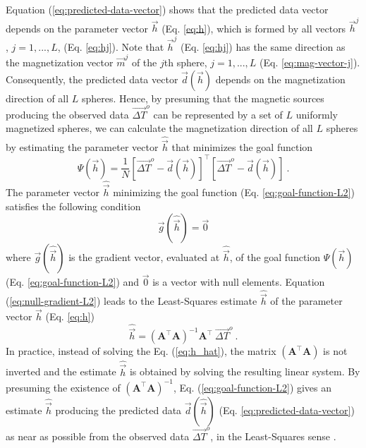\documentclass[journal abbreviation, npg]{copernicus}
\begin{document}
Equation (\ref{eq:predicted-data-vector}) shows that the predicted data vector depends on the parameter vector $\vec{h}$ (Eq. \ref{eq:h}), which is formed by all vectors $\vec{h}^{j}$, $j = 1, ..., L$, (Eq. \ref{eq:hj}). Note that $\vec{h}^{j}$ (Eq. \ref{eq:hj}) has the same direction as the magnetization vector $\vec{m}^{j}$ of the $j$th sphere, $j = 1, ..., L$ (Eq. \ref{eq:mag-vector-j}). Consequently, the predicted data vector $\vec{d}(\vec{h})$ depends on the magnetization direction of all $L$ spheres. Hence, by presuming that the magnetic sources producing the observed data $\vec{\Delta T}^{o}$ can be represented by a set of $L$ uniformly magnetized spheres, we can calculate the magnetization direction of all $L$ spheres by estimating the parameter vector $\hat{\vec{h}}$ that minimizes the goal function
\begin{equation}
\Psi(\vec{h}) = \frac{1}{N}[\vec{\Delta T}^{o} - \vec{d}(\vec{h})]^{\intercal}[\vec{\Delta T}^{o} - \vec{d}(\vec{h})] \: .
\label{eq:goal-function-L2}
\end{equation}
The parameter vector $\hat{\vec{h}}$ minimizing the goal function (Eq. \ref{eq:goal-function-L2}) satisfies the following condition
\begin{equation}
\vec{g}(\hat{\vec{h}}) = \vec{0}
\label{eq:null-gradient-L2}
\end{equation}
where $\vec{g}(\hat{\vec{h}})$ is the gradient vector, evaluated at $\hat{\vec{h}}$, of the goal function $\Psi(\vec{h})$ (Eq. \ref{eq:goal-function-L2}) and $\vec{0}$ is a vector with null elements. Equation (\ref{eq:null-gradient-L2}) leads to the Least-Squares estimate $\hat{\vec{h}}$ of the parameter vector $\vec{h}$ (Eq. \ref{eq:h})
\begin{equation}
\hat{\vec{h}} = (\mathbf{A}^{\intercal}\mathbf{A})^{-1} \mathbf{A}^{\intercal} \: \vec{\Delta T}^{o} \: .
\label{eq:h_hat}
\end{equation}
In practice, instead of solving the Eq. (\ref{eq:h_hat}), the matrix $(\mathbf{A}^{\intercal} \mathbf{A})$ is not inverted and the estimate $\hat{\vec{h}}$ is obtained by solving the resulting linear system. By presuming the existence of $(\mathbf{A}^{\intercal} \mathbf{A})^{-1}$, Eq. (\ref{eq:goal-function-L2}) gives an estimate $\hat{\vec{h}}$ producing the predicted data $\vec{d}(\hat{\vec{h}})$ (Eq. \ref{eq:predicted-data-vector}) as near as possible from the observed data $\vec{\Delta T}^{o}$, in the Least-Squares sense \citep{bard1973, twomey1977, menke1989, aster-etal2005}.
\end{document}

